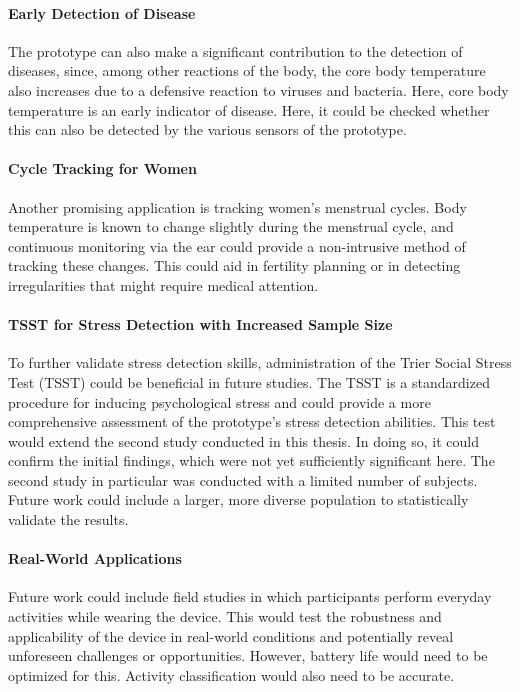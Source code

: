 \paragraph{Early Detection of Disease}
The prototype can also make a significant contribution to the detection of diseases, since, among other reactions of the body, the core body temperature also increases due to a defensive reaction to viruses and bacteria. Here, core body temperature is an early indicator of disease.
Here, it could be checked whether this can also be detected by the various sensors of the prototype.

\paragraph{Cycle Tracking for Women}
Another promising application is tracking women's menstrual cycles. 
Body temperature is known to change slightly during the menstrual cycle, and continuous monitoring via the ear could provide a non-intrusive method of tracking these changes. 
This could aid in fertility planning or in detecting irregularities that might require medical attention.

\paragraph{TSST for Stress Detection with Increased Sample Size}
To further validate stress detection skills, administration of the Trier Social Stress Test (TSST) could be beneficial in future studies. 
The TSST is a standardized procedure for inducing psychological stress and could provide a more comprehensive assessment of the prototype's stress detection abilities. 
This test would extend the second study conducted in this thesis.
In doing so, it could confirm the initial findings, which were not yet sufficiently significant here.
The second study in particular was conducted with a limited number of subjects. 
Future work could include a larger, more diverse population to statistically validate the results.

\paragraph{Real-World Applications}
Future work could include field studies in which participants perform everyday activities while wearing the device. 
This would test the robustness and applicability of the device in real-world conditions and potentially reveal unforeseen challenges or opportunities.
However, battery life would need to be optimized for this.
Activity classification would also need to be accurate.

